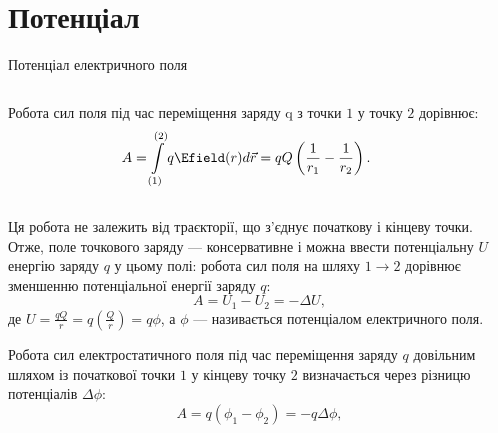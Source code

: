 \documentclass{beamer}
\begin{document}
\section{Потенціал}





\begin{frame}{Потенціал електричного поля}{}
	\begin{columns}
		\begin{column}{0.7\linewidth}\justifying
			Робота сил поля під час переміщення заряду q з точки $1$ у точку $2$
			дорівнює:
			\begin{equation*}
				A = \int\limits_{(1)}^{(2)} q\Efield(r) d\vec{r} =
				qQ\left(\frac1{r_1} - \frac1{r_2}\right).
			\end{equation*}

		\end{column}
		\begin{column}{0.3\linewidth}\centering
			
		\end{column}
	\end{columns}
	\begin{overprint}
		\begin{block}{}\justifying
			Ця \alert{робота не залежить від траєкторії}, що з'єднує початкову
			і кінцеву точки. Отже, поле точкового заряду ---
			\alert{консервативне} і можна ввести \alert{потенціальну $U$
				енергію} заряду $q$ у цьому полі: робота сил поля на шляху $1 \to
				2$ дорівнює зменшенню потенціальної енергії заряду $q$:
			\begin{equation*}
				A = U_1 - U_2 = - \Delta U,
			\end{equation*}
			де $ U = \frac{qQ}{r} = q \left( \frac{Q}{r} \right)  = q\phi$, а
			$\phi$
			--- називається \alert{потенціалом електричного поля}.
		\end{block}
		\begin{block}{}\justifying
			Робота сил електростатичного поля під час переміщення заряду $q$
			довільним шляхом із початкової точки $1$ у кінцеву точку $2$
			визначається через \alert{різницю потенціалів $\Delta\phi$}:
			\begin{equation*}
				A = q(\phi_1 - \phi_2) = - q\Delta\phi,
			\end{equation*}
		\end{block}
	\end{overprint}
\end{frame}
\end{document}
